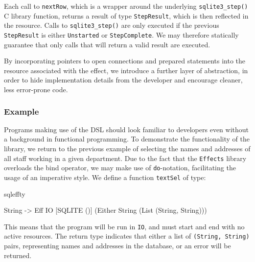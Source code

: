 \noindent
Each call to \texttt{nextRow}, which is a wrapper around the underlying
\texttt{sqlite3\_step()} C library function, returns a result of type
\texttt{StepResult}, which is then reflected in the resource. Calls to
\texttt{sqlite3\_step()} are only executed if the previous \texttt{StepResult}
is either \texttt{Unstarted} or \texttt{StepComplete}. We may therefore
statically guarantee that only calls that will return a valid result are
executed. 

By incorporating pointers to open connections and prepared statements into the
resource associated with the effect, we introduce a further layer of
abstraction, in order to hide implementation details from the developer and
encourage cleaner, less error-prone code. 

\subsubsection{Example}

Programs making use of the DSL should look familiar to developers even without
a background in functional programming. To demonstrate the functionality of the
library, we return to the previous example of selecting the names and addresses
of all staff working in a given department. Due to the fact that the
\texttt{Effects} library overloads the bind operator, we may make use of
\texttt{do}-notation, facilitating the usage of an imperative style.
We define a function \texttt{textSel} of type:

\noindent
\begin{SaveVerbatim}{sqleffty}

String ->
Eff IO [SQLITE ()] (Either String (List (String, String)))

\end{SaveVerbatim}

\noindent
This means that the program will be run in \texttt{IO}, and must
start and end with no active resources. The return type indicates that either a
list of \texttt{(String, String)} pairs, representing names and addresses in the
database, or an error will be returned.


